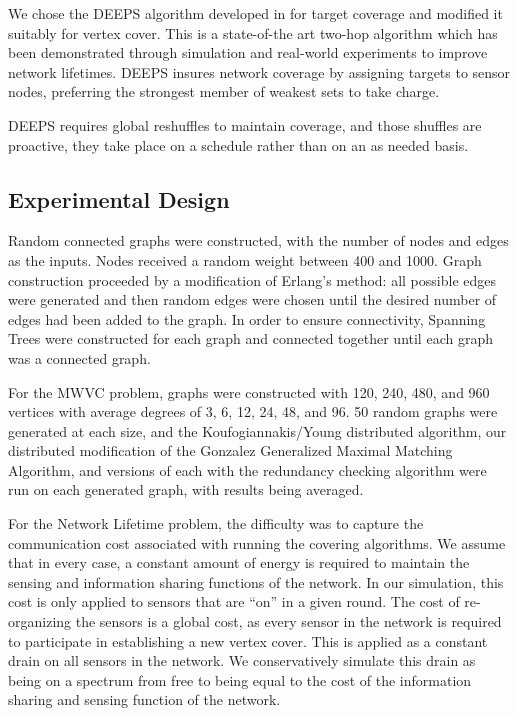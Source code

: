 We chose the DEEPS algorithm developed in \cite{1640702}for target coverage and modified it suitably for vertex cover. This is a state-of-the art two-hop algorithm which has been demonstrated through simulation and real-world experiments to improve network lifetimes. DEEPS insures network coverage by assigning targets to sensor nodes, preferring the strongest member of weakest sets to take charge. 

DEEPS requires global reshuffles to maintain coverage, and those shuffles are proactive, they take place on a schedule rather than on an as needed basis.

\subsection{Experimental Design}
\label{sub:exp-design}
Random connected graphs were constructed, with the number of nodes and edges as the inputs. Nodes received a random weight between 400 and 1000. Graph construction proceeded by a modification of Erlang's method: all possible edges were generated and then random edges were chosen until the desired number of edges had been added to the graph. In order to ensure connectivity, Spanning Trees were constructed for each graph and connected together until each graph was a connected graph. 

For the MWVC problem, graphs were constructed with 120, 240, 480, and 960 vertices with average degrees of 3, 6, 12, 24, 48, and 96. 50 random graphs were generated at each size, and the Koufogiannakis/Young distributed algorithm\cite{1582746}, our distributed modification of the Gonzalez Generalized Maximal Matching Algorithm\cite{Gonzalez1995129}, and versions of each with the redundancy checking algorithm were run on each generated graph, with results being averaged.

For the Network Lifetime problem, the difficulty was to capture the communication cost associated with running the covering algorithms. We assume that in every case, a constant amount of energy is required to maintain the sensing and information sharing functions of the network. In our simulation, this cost is only applied to sensors that are ``on'' in a given round. The cost of re-organizing the sensors is a global cost, as every sensor in the network is required to participate in establishing a new vertex cover. This is applied as a constant drain on all sensors in the network. We conservatively simulate this drain as being on a spectrum from free to being equal to the cost of the information sharing and sensing function of the network. 

